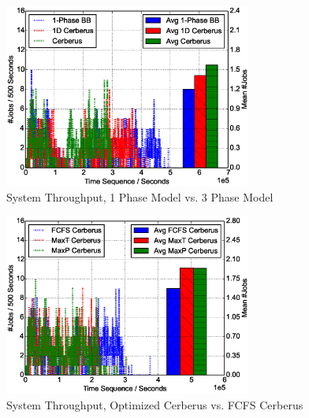 \begin{figure}[!t]
        \centering
        \includegraphics[width=3.2in]{3Pvs1PFigures/1000jobs_3p_vs_1p_throughput}
        \caption{System Throughput, 1 Phase Model vs. 3 Phase Model}
        \label{Fig:3Pvs1PThroughput}
\end{figure}


\begin{figure}[!t]
        \centering
        \includegraphics[width=3.2in]{DPvsFIFOFigures/1000jobs_dp_vs_fifo_throughput}
        \caption{System Throughput, Optimized Cerberus vs. FCFS Cerberus}
        \label{Fig:DPvsFIFOThroughput}
\end{figure}


